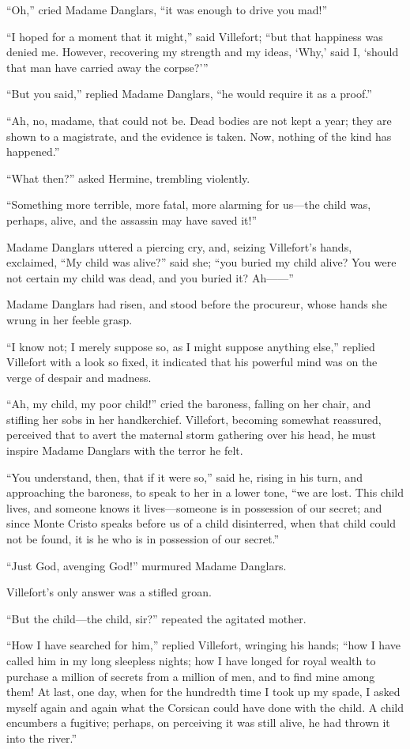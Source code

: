 “Oh,” cried Madame Danglars, “it was enough to drive you mad!”

“I hoped for a moment that it might,” said Villefort; “but that
happiness was denied me. However, recovering my strength and my ideas,
‘Why,’ said I, ‘should that man have carried away the corpse?’”

“But you said,” replied Madame Danglars, “he would require it as a
proof.”

“Ah, no, madame, that could not be. Dead bodies are not kept a year;
they are shown to a magistrate, and the evidence is taken. Now, nothing
of the kind has happened.”

“What then?” asked Hermine, trembling violently.

“Something more terrible, more fatal, more alarming for us—the child
was, perhaps, alive, and the assassin may have saved it!”

Madame Danglars uttered a piercing cry, and, seizing Villefort’s hands,
exclaimed, “My child was alive?” said she; “you buried my child alive?
You were not certain my child was dead, and you buried it? Ah——”

Madame Danglars had risen, and stood before the procureur, whose hands
she wrung in her feeble grasp.

“I know not; I merely suppose so, as I might suppose anything else,”
replied Villefort with a look so fixed, it indicated that his powerful
mind was on the verge of despair and madness.

“Ah, my child, my poor child!” cried the baroness, falling on her
chair, and stifling her sobs in her handkerchief. Villefort, becoming
somewhat reassured, perceived that to avert the maternal storm
gathering over his head, he must inspire Madame Danglars with the
terror he felt.

“You understand, then, that if it were so,” said he, rising in his
turn, and approaching the baroness, to speak to her in a lower tone,
“we are lost. This child lives, and someone knows it lives—someone is
in possession of our secret; and since Monte Cristo speaks before us of
a child disinterred, when that child could not be found, it is he who
is in possession of our secret.”

“Just God, avenging God!” murmured Madame Danglars.

Villefort’s only answer was a stifled groan.

“But the child—the child, sir?” repeated the agitated mother.

“How I have searched for him,” replied Villefort, wringing his hands;
“how I have called him in my long sleepless nights; how I have longed
for royal wealth to purchase a million of secrets from a million of
men, and to find mine among them! At last, one day, when for the
hundredth time I took up my spade, I asked myself again and again what
the Corsican could have done with the child. A child encumbers a
fugitive; perhaps, on perceiving it was still alive, he had thrown it
into the river.”

